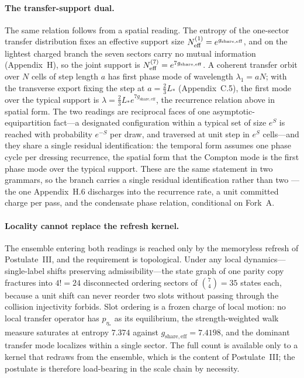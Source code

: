 \documentclass[11pt]{article}
\begin{document}
\paragraph{The transfer-support dual.}
The same relation follows from a spatial reading. The entropy of the one-sector transfer distribution fixes an effective support size $N^{(1)}_{\rm eff}=e^{g_{\mathrm{share,eff}}}$, and on the lightest charged branch the seven sectors carry no mutual information (Appendix~H), so the joint support is $N^{(7)}_{\rm eff}=e^{7g_{\mathrm{share,eff}}}$. A coherent transfer orbit over $N$ cells of step length $a$ has first phase mode of wavelength $\lambda_1=aN$; with the transverse export fixing the step at $a=\tfrac23 L_*$ (Appendix~C.5), the first mode over the typical support is $\lambda=\tfrac23L_*e^{7g_{\mathrm{share,eff}}}$, the recurrence relation above in spatial form. The two readings are reciprocal faces of one asymptotic-equipartition fact---a designated configuration within a typical set of size $e^{S}$ is reached with probability $e^{-S}$ per draw, and traversed at unit step in $e^{S}$ cells---and they share a single residual identification: the temporal form assumes one phase cycle per dressing recurrence, the spatial form that the Compton mode is the first phase mode over the typical support. These are the same statement in two grammars, so the branch carries a single residual identification rather than two --- the one Appendix~H.6 discharges into the recurrence rate, a unit committed charge per pass, and the condensate phase relation, conditional on Fork~A.

\paragraph{Locality cannot replace the refresh kernel.}
The ensemble entering both readings is reached only by the memoryless refresh of Postulate~III, and the requirement is topological. Under any local dynamics---single-label shifts preserving admissibility---the state graph of one parity copy fractures into $4!=24$ disconnected ordering sectors of $\binom{7}{4}=35$ states each, because a unit shift can never reorder two slots without passing through the collision injectivity forbids. Slot ordering is a frozen charge of local motion: no local transfer operator has $p_{\eta_*}$ as its equilibrium, the strength-weighted walk measure saturates at entropy $7.374$ against $g_{\mathrm{share,eff}}=7.4198$, and the dominant transfer mode localizes within a single sector. The full count is available only to a kernel that redraws from the ensemble, which is the content of Postulate~III; the postulate is therefore load-bearing in the scale chain by necessity.
\end{document}
